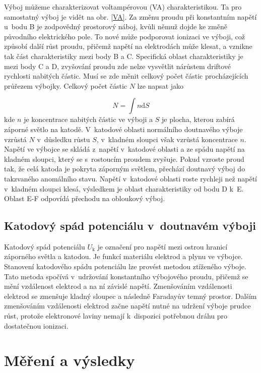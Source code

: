 \documentclass[a4paper,12pt]{article}
\begin{document}
Výboj můžeme charakterizovat voltampérovou (VA) charakteristikou. Ta pro 
samostatný výboj je vidět na obr. \ref{VA}. Za změnu proudu při konstantním 
napětí u~bodu B je zodpovědný prostorový náboj, kvůli němuž dojde ke změně 
původního elektrického pole. To nové může podporovat ionizaci ve výboji, což 
způsobí další růst proudu, přičemž napětí na elektrodách může klesat, a vznikne 
tak část charakteristiky mezi body B a C. Specifická oblast charakteristiky je 
mezi body C a D, zvyšování proudu zde nelze vysvětlit nárůstem driftové 
rychlosti nabitých částic. Musí se zde měnit celkový počet částic 
procházejících průřezem výbojky. Celkový počet částic $N$ lze napsat jako

\begin{equation}
	N = \int n \text{d}S
	\label{10}
\end{equation}
kde $n$ je koncentrace nabitých částic ve výboji a $S$ je plocha, kterou zabírá 
záporné světlo na katodě. V~katodové oblasti normálního doutnavého výboje 
vzrůstá $N$ v~důsledku růstu $S$, v~kladném sloupci však vzrůstá koncentrace 
$n$. Napětí ve výbojce se skládá z~napětí v~katodové oblasti a ze spádu napětí 
na kladném sloupci, který se s~rostoucím proudem zvyšuje. Pokud vzroste proud 
tak, že celá katoda je pokryta záporným světlem, přechází doutnavý výboj do 
takzvaného anomálního stavu. Napětí v~katodové oblasti roste rychleji než 
napětí v~kladném sloupci klesá, výsledkem je oblast charakteristiky od bodu D 
k~E. Oblast E-F odpovídá přechodu na obloukový výboj.

\subsection{Katodový spád potenciálu v~doutnavém výboji}
Katodový spád potenciálu $U_\text{k}$ je označení pro napětí mezi ostrou 
hranicí záporného světla a katodou. Je funkcí materiálu elektrod a plynu ve 
výbojce. Stanovení katodového spádu potenciálu lze provést metodou ztíženého 
výboje. 
Tato metoda spočívá v~udržování konstantního výbojového proudu, přičemž se mění 
vzdálenost elektrod a na ní závislé napětí. Zmenšováním vzdálenosti elektrod se 
zmenšuje kladný sloupec a následně Faradayův temný prostor. Dalším 
zmen\-šo\-vá\-ním vzdálenosti elektrod začne napětí nutné na 
udržení výboje prudce růst, protože elektronové laviny nemají k~dispozici 
potřebnou dráhu pro dostatečnou ionizaci.

\section{Měření a výsledky}
\end{document}
